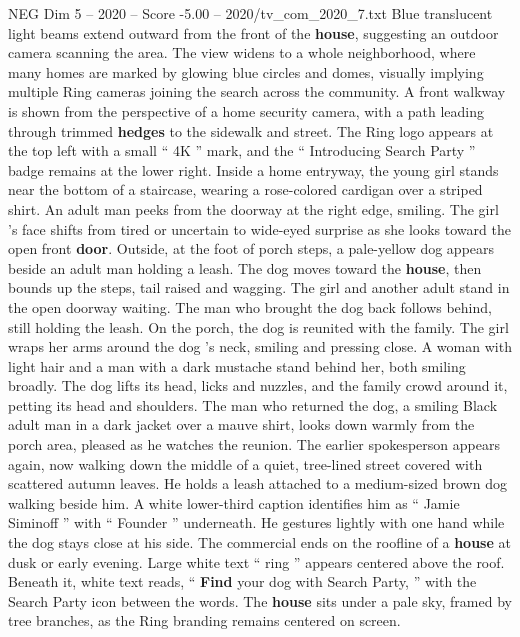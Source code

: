 \begin{textsample}{NEG Dim 5 – 2020 – Score -5.00 – 2020/tv\_com\_2020\_7.txt}
Blue translucent light beams extend outward from the front of the \textbf{house}, suggesting an outdoor camera scanning the area.
The view widens to a whole neighborhood, where many homes are marked by glowing blue circles and domes, visually implying multiple Ring cameras joining the search across the community.
A front walkway is shown from the perspective of a home security camera, with a path leading through trimmed \textbf{hedges} to the sidewalk and street.
The Ring logo appears at the top left with a small “ 4K ” mark, and the “ Introducing Search Party ” badge remains at the lower right.
Inside a home entryway, the young girl stands near the bottom of a staircase, wearing a rose-colored cardigan over a striped shirt.
An adult man peeks from the doorway at the right edge, smiling.
The girl ’s face shifts from tired or uncertain to wide-eyed surprise as she looks toward the open front \textbf{door}.
Outside, at the foot of porch steps, a pale-yellow dog appears beside an adult man holding a leash.
The dog moves toward the \textbf{house}, then bounds up the steps, tail raised and wagging.
The girl and another adult stand in the open doorway waiting.
The man who brought the dog back follows behind, still holding the leash.
On the porch, the dog is reunited with the family.
The girl wraps her arms around the dog ’s neck, smiling and pressing close.
A woman with light hair and a man with a dark mustache stand behind her, both smiling broadly.
The dog lifts its head, licks and nuzzles, and the family crowd around it, petting its head and shoulders.
The man who returned the dog, a smiling Black adult man in a dark jacket over a mauve shirt, looks down warmly from the porch area, pleased as he watches the reunion.
The earlier spokesperson appears again, now walking down the middle of a quiet, tree-lined street covered with scattered autumn leaves.
He holds a leash attached to a medium-sized brown dog walking beside him.
A white lower-third caption identifies him as “ Jamie Siminoff ” with “ Founder ” underneath.
He gestures lightly with one hand while the dog stays close at his side.
The commercial ends on the roofline of a \textbf{house} at dusk or early evening.
Large white text “ ring ” appears centered above the roof.
Beneath it, white text reads, “ \textbf{Find} your dog with Search Party, ” with the Search Party icon between the words.
The \textbf{house} sits under a pale sky, framed by tree branches, as the Ring branding remains centered on screen.

\end{textsample}
